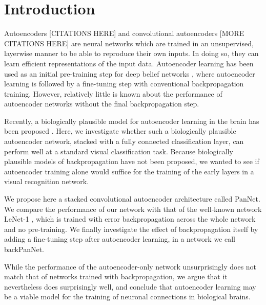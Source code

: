 \chapter{Introduction} %

\label{Chapter 1} %

Autoencoders [CITATIONS HERE] and convolutional autoencoders [MORE CITATIONS HERE] \cite{masci_stacked_2011} are neural networks which are trained in an unsupervised, layerwise manner to be able to reproduce their own inputs. In doing so, they can learn efficient representations of the input data. Autoencoder learning has been used as an initial pre-training step for deep belief networks \cite{hinton_reducing_2006}, where autoencoder learning is followed by a fine-tuning step with conventional backpropagation training. However,  relatively little is known about the performance of autoencoder networks without the final backpropagation step.

Recently, a biologically plausible model for autoencoder learning in the brain has been proposed \cite{burbank_mirrored_2015}. Here, we investigate whether such a biologically plausible autoencoder network, stacked with a fully connected classification layer, can perform well at a standard visual classification task. Because biologically plausible models of backpropagation have not been proposed, we wanted to see if autoencoder training alone would suffice for the training of the early layers in a visual recognition network.


We propose here a stacked convolutional autoencoder architecture called PanNet. We compare the performance of our network with that of the well-known network LeNet-1 \cite{lecun_gradient-based_1998}, which is trained with error backpropagation across the whole network and no pre-training. We finally investigate the effect of backpropagation itself by adding a fine-tuning step after autoencoder learning, in a network we call backPanNet.

While the performance of the autoencoder-only network unsurprisingly does not match that of networks trained with backpropagation, we argue that it nevertheless does surprisingly well, and conclude that autoencoder learning may be a viable model for the training of neuronal connections in biological brains.
